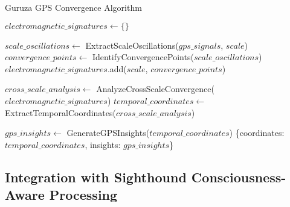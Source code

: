 \documentclass[12pt,a4paper]{article}
\begin{document}
\begin{algorithm}
\caption{Guruza GPS Convergence Algorithm}
\begin{algorithmic}
    \State $electromagnetic\_signatures \gets \{\}$
    
        \State $scale\_oscillations \gets$ ExtractScaleOscillations($gps\_signals$, $scale$)
        \State $convergence\_points \gets$ IdentifyConvergencePoints($scale\_oscillations$)
        \State $electromagnetic\_signatures$.add($scale$, $convergence\_points$)
    \EndFor
    
    \State $cross\_scale\_analysis \gets$ AnalyzeCrossScaleConvergence($electromagnetic\_signatures$)
    \State $temporal\_coordinates \gets$ ExtractTemporalCoordinates($cross\_scale\_analysis$)
    
    \State $gps\_insights \gets$ GenerateGPSInsights($temporal\_coordinates$)
    \State \Return \{coordinates: $temporal\_coordinates$, insights: $gps\_insights$\}
\EndProcedure
\end{algorithmic}
\end{algorithm}

\subsection{Integration with Sighthound Consciousness-Aware Processing}
\end{document}
